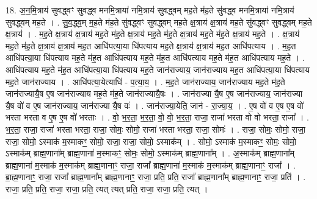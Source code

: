 \documentclass[17pt]{extarticle}
\begin{document}
18. अ॒न॒मि॒त्राय॑ सुवद्ध्वꣳ सुवद्ध्व मनमि॒त्राया॑ नमि॒त्राय॑ सुवद्ध्वम् मह॒ते म॑ह॒ते सु॑वद्ध्व मनमि॒त्राया॑ नमि॒त्राय॑ सुवद्ध्वम् मह॒ते । . सु॒व॒द्ध्व॒म् म॒ह॒ते म॑ह॒ते सु॑वद्ध्वꣳ सुवद्ध्वम् मह॒ते क्ष॒त्राय॑ क्ष॒त्राय॑ मह॒ते सु॑वद्ध्वꣳ सुवद्ध्वम् मह॒ते क्ष॒त्राय॑ । . म॒ह॒ते क्ष॒त्राय॑ क्ष॒त्राय॑ मह॒ते म॑ह॒ते क्ष॒त्राय॑ मह॒ते म॑ह॒ते क्ष॒त्राय॑ मह॒ते म॑ह॒ते क्ष॒त्राय॑ मह॒ते । . क्ष॒त्राय॑ मह॒ते म॑ह॒ते क्ष॒त्राय॑ क्ष॒त्राय॑ मह॒त आधि॑पत्या॒या धि॑पत्याय मह॒ते क्ष॒त्राय॑ क्ष॒त्राय॑ मह॒त आधि॑पत्याय । . म॒ह॒त आधि॑पत्या॒या धि॑पत्याय मह॒ते म॑ह॒त आधि॑पत्याय मह॒ते म॑ह॒त आधि॑पत्याय मह॒ते म॑ह॒त आधि॑पत्याय मह॒ते । . आधि॑पत्याय मह॒ते म॑ह॒त आधि॑पत्या॒या धि॑पत्याय मह॒ते जान॑राज्याय॒ जान॑राज्याय मह॒त आधि॑पत्या॒या धि॑पत्याय मह॒ते जान॑राज्याय । . आधि॑पत्या॒येत्याधि॑ - प॒त्या॒य॒ । . म॒ह॒ते जान॑राज्याय॒ जान॑राज्याय मह॒ते म॑ह॒ते जान॑राज्यायै॒ष ए॒ष जान॑राज्याय मह॒ते म॑ह॒ते जान॑राज्यायै॒षः । . जान॑राज्या यै॒ष ए॒ष जान॑राज्याय॒ जान॑राज्या यै॒ष वो॑ व ए॒ष जान॑राज्याय॒ जान॑राज्या यै॒ष वः॑ । . जान॑राज्या॒येति॒ जान॑ - रा॒ज्या॒य॒ । . ए॒ष वो॑ व ए॒ष ए॒ष वो॑ भरता भरता व ए॒ष ए॒ष वो॑ भरताः । . वो॒ भ॒र॒ता॒ भ॒र॒ता॒ वो॒ वो॒ भ॒र॒ता॒ राजा॒ राजा॑ भरता वो वो भरता॒ राजा᳚ । . भ॒र॒ता॒ राजा॒ राजा॑ भरता भरता॒ राजा॒ सोमः॒ सोमो॒ राजा॑ भरता भरता॒ राजा॒ सोमः॑ । . राजा॒ सोमः॒ सोमो॒ राजा॒ राजा॒ सोमो॒ ऽस्माक॑ म॒स्माकꣳ॒॒ सोमो॒ राजा॒ राजा॒ सोमो॒ ऽस्माक᳚म् । . सोमो॒ ऽस्माक॑ म॒स्माकꣳ॒॒ सोमः॒ सोमो॒ ऽस्माक॑म् ब्राह्म॒णाना᳚म् ब्राह्म॒णाना॑ म॒स्माकꣳ॒॒ सोमः॒ सोमो॒ ऽस्माक॑म् ब्राह्म॒णाना᳚म् । . अ॒स्माक॑म् ब्राह्म॒णाना᳚म् ब्राह्म॒णाना॑ म॒स्माक॑ म॒स्माक॑म् ब्राह्म॒णानाꣳ॒॒ राजा॒ राजा᳚ ब्राह्म॒णाना॑ म॒स्माक॑ म॒स्माक॑म् ब्राह्म॒णानाꣳ॒॒ राजा᳚ । . ब्रा॒ह्म॒णानाꣳ॒॒ राजा॒ राजा᳚ ब्राह्म॒णाना᳚म् ब्राह्म॒णानाꣳ॒॒ राजा॒ प्रति॒ प्रति॒ राजा᳚ ब्राह्म॒णाना᳚म् ब्राह्म॒णानाꣳ॒॒ राजा॒ प्रति॑ । . राजा॒ प्रति॒ प्रति॒ राजा॒ राजा॒ प्रति॒ त्यत् त्यत् प्रति॒ राजा॒ राजा॒ प्रति॒ त्यत् । \newline
\end{document}
